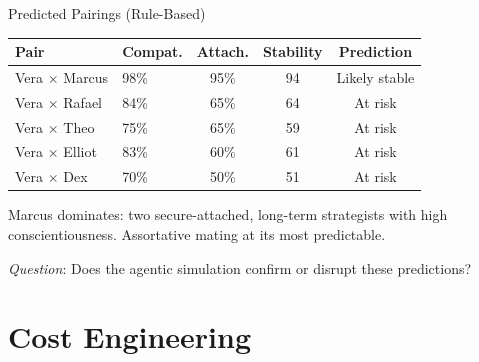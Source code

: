 \documentclass[aspectratio=169, 11pt]{beamer}
\begin{document}
\begin{frame}{Predicted Pairings (Rule-Based)}
\begin{tabular}{@{}llccc@{}}
\toprule
\textbf{Pair} & \textbf{Compat.} & \textbf{Attach.} & \textbf{Stability} & \textbf{Prediction} \\
\midrule
Vera $\times$ \textcolor{marcus}{Marcus} & 98\% & 95\% & 94 & Likely stable \\
Vera $\times$ \textcolor{rafael}{Rafael} & 84\% & 65\% & 64 & At risk \\
Vera $\times$ \textcolor{theo}{Theo} & 75\% & 65\% & 59 & At risk \\
Vera $\times$ \textcolor{elliot}{Elliot} & 83\% & 60\% & 61 & At risk \\
Vera $\times$ \textcolor{dex}{Dex} & 70\% & 50\% & 51 & At risk \\
\bottomrule
\end{tabular}

\vspace{1em}
Marcus dominates: two secure-attached, long-term strategists with high conscientiousness. Assortative mating at its most predictable.

\vspace{0.5em}
\textit{Question}: Does the agentic simulation confirm or disrupt these predictions?
\end{frame}

\section{Cost Engineering}
\end{document}

